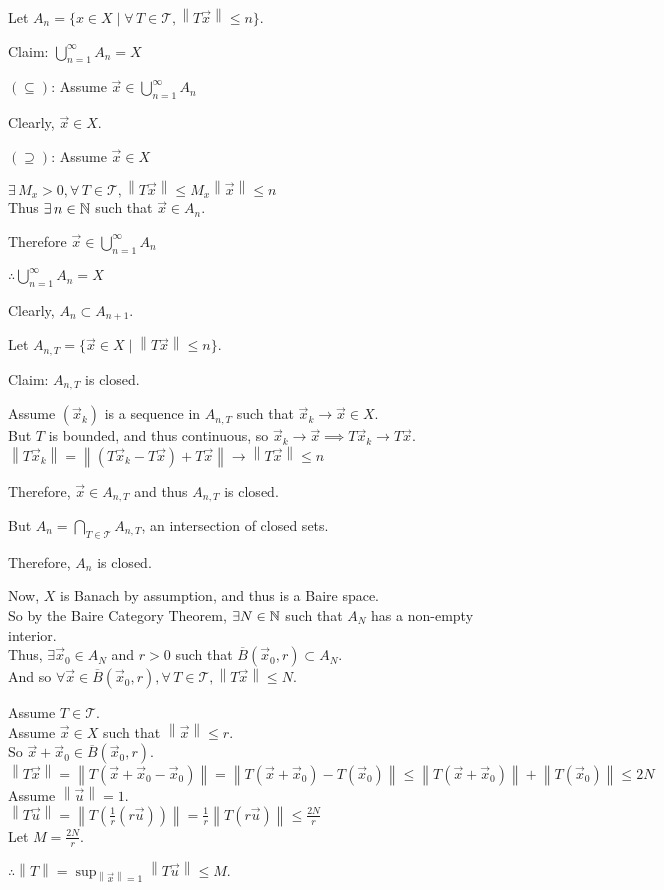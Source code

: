 \documentclass[letterpaper,12pt,fleqn]{article}
\newcommand{\T}{\mathcal{T}}
\newcommand{\norm}[1]{\left\|#1\right\|}
\newcommand{\vx}{\vec{x}}
\newcommand{\vu}{\vec{u}}
\newcommand{\cl}[1]{\overline{#1}}
\begin{document}
\begin{theproof}
  Let $A_n=\{x\in X\mid\forall\,T\in\T,\norm{T\vx}\le n\}$.

  Claim: $\bigcup_{n=1}^{\infty}A_n=X$

  \begin{description}
  \item $(\subseteq)$: Assume $\vx\in\bigcup_{n=1}^{\infty}A_n$

    Clearly, $\vx\in X$.

  \item $(\supseteq)$: Assume $\vx\in X$

    $\exists\,M_x>0,\forall\,T\in\T,\norm{T\vx}\le M_x\norm{\vx}\le n$ \\
    Thus $\exists\,n\in\mathbb{N}$ such that $\vx\in A_n$.

    Therefore $\vx\in\bigcup_{n=1}^{\infty}A_n$
  \end{description}

  $\therefore\bigcup_{n=1}^{\infty}A_n=X$

  Clearly, $A_n\subset A_{n+1}$.

  Let $A_{n,T}=\{\vx\in X\mid\norm{T\vx}\le n\}$.

  Claim: $A_{n,T}$ is closed.

  Assume $(\vx_k)$ is a sequence in $A_{n,T}$ such that $\vx_k\to\vx\in X$. \\
  But $T$ is bounded, and thus continuous, so
  $\vx_k\to\vx\implies T\vx_k\to T\vx$. \\
  $\norm{T\vx_k}=\norm{(T\vx_k-T\vx)+T\vx}\to\norm{T\vx}\le n$

  Therefore, $\vx\in A_{n,T}$ and thus $A_{n,T}$ is closed.

  But $A_n=\bigcap_{T\in\T}A_{n,T}$, an intersection of closed sets.

  Therefore, $A_n$ is closed.

  Now, $X$ is Banach by assumption, and thus is a Baire space. \\
  So by the Baire Category Theorem, $\exists N\in\mathbb{N}$ such that $A_N$ has a
  non-empty interior. \\
  Thus, $\exists\vx_0\in A_N$ and $r>0$ such that
  $\cl{B}(\vx_0,r)\subset A_N$. \\
  And so $\forall\vx\in\cl{B}(\vx_0,r),\forall\,T\in\T,\norm{T\vx}\le N$.

  Assume $T\in\T$. \\
  Assume $\vx\in X$ such that $\norm{\vx}\le r$. \\
  So $\vx+\vx_0\in\cl{B}(\vx_0,r)$. \\
  $\norm{T\vx}=\norm{T(\vx+\vx_0-\vx_0)}=\norm{T(\vx+\vx_0)-T(\vx_0)}\le
  \norm{T(\vx+\vx_0)}+\norm{T(\vx_0)}\le2N$ \\

  Assume $\norm{\vu}=1$. \\
  $\norm{T\vu}=\norm{T\left(\frac{1}{r}(r\vu)\right)}=
  \frac{1}{r}\norm{T(r\vu)}\le\frac{2N}{r}$ \\
  Let $M=\frac{2N}{r}$.

  $\therefore\norm{T}=\sup_{\norm{\vx}=1}\norm{T\vu}\le M$.
\end{theproof}
\end{document}
